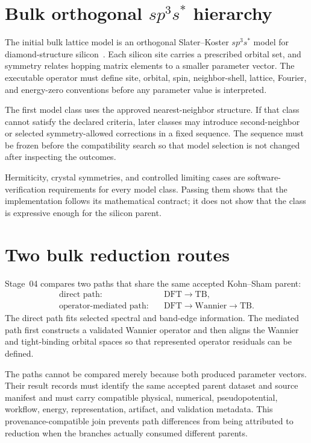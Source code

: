 \section{Bulk orthogonal $sp^3s^{\ast}$ hierarchy}

The initial bulk lattice model is an orthogonal Slater--Koster
$sp^3s^{\ast}$ model for diamond-structure
silicon~\cite{slater1954,vogl1983}. Each silicon site carries a
prescribed orbital set, and symmetry relates hopping matrix elements to a
smaller parameter vector. The executable operator must define site, orbital,
spin, neighbor-shell, lattice, Fourier, and energy-zero conventions before any
parameter value is interpreted.

The first model class uses the approved nearest-neighbor structure. If that
class cannot satisfy the declared criteria, later classes may introduce
second-neighbor or selected symmetry-allowed corrections in a fixed sequence.
The sequence must be frozen before the compatibility search so that model
selection is not changed after inspecting the outcomes.

Hermiticity, crystal symmetries, and controlled limiting cases are
software-verification requirements for every model class. Passing them shows
that the implementation follows its mathematical contract; it does not show
that the class is expressive enough for the silicon parent.

\section{Two bulk reduction routes}

Stage~04 compares two paths that share the same accepted Kohn--Sham parent:
\begin{align}
  \text{direct path:}\quad
  &\mathrm{DFT}\longrightarrow\mathrm{TB},\\
  \text{operator-mediated path:}\quad
  &\mathrm{DFT}\longrightarrow\mathrm{Wannier}
    \longrightarrow\mathrm{TB}.
\end{align}
The direct path fits selected spectral and band-edge information. The mediated
path first constructs a validated Wannier operator and then aligns the
Wannier and tight-binding orbital spaces so that represented operator residuals
can be defined.

The paths cannot be compared merely because both produced parameter vectors.
Their result records must identify the same accepted parent dataset and source
manifest and must carry compatible physical, numerical, pseudopotential,
workflow, energy, representation, artifact, and validation metadata. This
provenance-compatible join prevents path differences from being attributed to
reduction when the branches actually consumed different parents.

